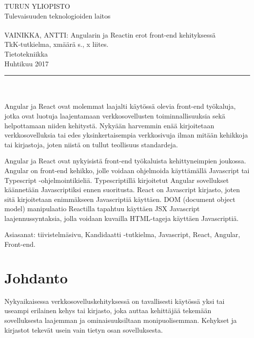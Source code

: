 \documentclass[a4paper,12pt,twoside]{article} %
\renewcommand{\baselinestretch}{1}
\begin{document}
\begin{minipage}{15cm}

\noindent
TURUN YLIOPISTO\\
Tulevaisuuden teknologioiden laitos\\
\\
VAINIKKA, ANTTI: Angularin ja Reactin erot front-end kehityksessä\\
TkK-tutkielma, xmäärä s., x liites.\\
Tietotekniikka\\
Huhtikuu 2017\\
\rule{\textwidth}{.2mm}\\
\\
Angular ja React ovat molemmat laajalti käytössä olevia front-end työkaluja, jotka ovat luotuja laajentamaan verkkosovellusten toiminnallisuuksia sekä helpottamaan niiden kehitystä. Nykyään harvemmin enää kirjoitetaan verkkosovelluksia tai edes yksinkertaisempia verkkosivuja ilman mitään kehikkoja tai kirjastoja, joten niistä on tullut teollisuus standardeja.

\vspace{4mm}\noindent Angular ja React ovat nykyisistä front-end työkaluista kehittyneimpien joukossa. Angular on front-end kehikko, jolle voidaan ohjelmoida käyttämällä Javascript tai Typescript -ohjelmointikieliä. Typescriptillä kirjoitetut Angular sovellukset käännetään Javascriptiksi ennen suoritusta. React on Javascript kirjasto, joten sitä kirjoitetaan enimmäkseen Javascriptiä käyttäen. DOM (document object model) manipulaatio Reactilla tapahtuu käyttäen JSX Javascript laajennussyntaksia, jolla voidaan kuvailla HTML-tageja käyttäen Javascriptiä.

\vspace{4mm}\noindent Asiasanat: tiivistelmäsivu, Kandidaatti -tutkielma, Javascript, React, Angular, Front-end.

\end{minipage}
\newpage
\tableofcontents
\newpage
\pagestyle{plain} 
\setcounter{page}{1}

\addtolength{\oddsidemargin}{1.1cm}
\addtolength{\voffset}{2.3cm}

\section{Johdanto}
\renewcommand{\baselinestretch}{2}

Nykyaikaisessa verkkosovelluskehityksessä on tavallisesti käytössä yksi tai useampi erilainen kehys tai kirjasto, joka auttaa kehittäjää tekemään sovelluksesta laajemman ja ominaisuuksiltaan monipuolisemman. Kehykset ja kirjastot tekevät usein vain tietyn osan sovelluksesta.
\end{document}

